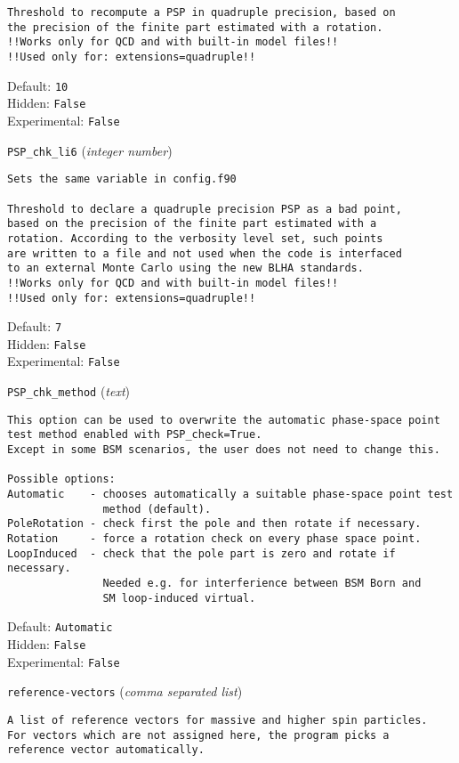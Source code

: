 \begin{basedescript}{\desclabelstyle{\pushlabel}}
\begin{verbatim}
Threshold to recompute a PSP in quadruple precision, based on
the precision of the finite part estimated with a rotation.
!!Works only for QCD and with built-in model files!!
!!Used only for: extensions=quadruple!!
\end{verbatim}
Default: \verb|10|
\\Hidden: \verb|False|
\\Experimental: \verb|False|
\\\item[\colorbox{gray!30}{\texttt{PSP\_chk\_li6}}] (\textit{integer number})
\begin{verbatim}
Sets the same variable in config.f90

Threshold to declare a quadruple precision PSP as a bad point,
based on the precision of the finite part estimated with a
rotation. According to the verbosity level set, such points
are written to a file and not used when the code is interfaced
to an external Monte Carlo using the new BLHA standards.
!!Works only for QCD and with built-in model files!!
!!Used only for: extensions=quadruple!!
\end{verbatim}
Default: \verb|7|
\\Hidden: \verb|False|
\\Experimental: \verb|False|
\\\item[\colorbox{gray!30}{\texttt{PSP\_chk\_method}}] (\textit{text})
\begin{verbatim}
This option can be used to overwrite the automatic phase-space point
test method enabled with PSP_check=True.
Except in some BSM scenarios, the user does not need to change this.

Possible options:
Automatic    - chooses automatically a suitable phase-space point test
               method (default).
PoleRotation - check first the pole and then rotate if necessary.
Rotation     - force a rotation check on every phase space point.
LoopInduced  - check that the pole part is zero and rotate if necessary.
               Needed e.g. for interferience between BSM Born and
               SM loop-induced virtual.
\end{verbatim}
Default: \verb|Automatic|
\\Hidden: \verb|False|
\\Experimental: \verb|False|
\\\item[\colorbox{gray!30}{\texttt{reference-vectors}}] (\textit{comma separated list})
\begin{verbatim}
A list of reference vectors for massive and higher spin particles.
For vectors which are not assigned here, the program picks a
reference vector automatically.


\end{verbatim}
\end{basedescript}
